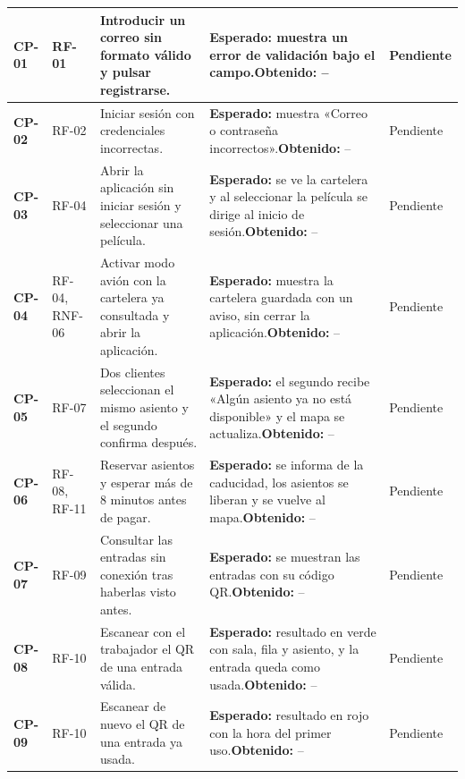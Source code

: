 \documentclass[11pt,a4paper]{article}
\begin{document}
\begin{longtable}{L{1.3cm} L{1.9cm} L{3.9cm} L{4.6cm} L{1.9cm}}
\textbf{CP-01} & RF-01 & Introducir un correo sin formato válido y pulsar registrarse. & \textbf{Esperado:} muestra un error de validación bajo el campo.\newline \textbf{Obtenido:} -- & Pendiente \\
\midrule
\textbf{CP-02} & RF-02 & Iniciar sesión con credenciales incorrectas. & \textbf{Esperado:} muestra «Correo o contraseña incorrectos».\newline \textbf{Obtenido:} -- & Pendiente \\
\midrule
\textbf{CP-03} & RF-04 & Abrir la aplicación sin iniciar sesión y seleccionar una película. & \textbf{Esperado:} se ve la cartelera y al seleccionar la película se dirige al inicio de sesión.\newline \textbf{Obtenido:} -- & Pendiente \\
\midrule
\textbf{CP-04} & RF-04, RNF-06 & Activar modo avión con la cartelera ya consultada y abrir la aplicación. & \textbf{Esperado:} muestra la cartelera guardada con un aviso, sin cerrar la aplicación.\newline \textbf{Obtenido:} -- & Pendiente \\
\midrule
\textbf{CP-05} & RF-07 & Dos clientes seleccionan el mismo asiento y el segundo confirma después. & \textbf{Esperado:} el segundo recibe «Algún asiento ya no está disponible» y el mapa se actualiza.\newline \textbf{Obtenido:} -- & Pendiente \\
\midrule
\textbf{CP-06} & RF-08, RF-11 & Reservar asientos y esperar más de 8 minutos antes de pagar. & \textbf{Esperado:} se informa de la caducidad, los asientos se liberan y se vuelve al mapa.\newline \textbf{Obtenido:} -- & Pendiente \\
\midrule
\textbf{CP-07} & RF-09 & Consultar las entradas sin conexión tras haberlas visto antes. & \textbf{Esperado:} se muestran las entradas con su código QR.\newline \textbf{Obtenido:} -- & Pendiente \\
\midrule
\textbf{CP-08} & RF-10 & Escanear con el trabajador el QR de una entrada válida. & \textbf{Esperado:} resultado en verde con sala, fila y asiento, y la entrada queda como usada.\newline \textbf{Obtenido:} -- & Pendiente \\
\midrule
\textbf{CP-09} & RF-10 & Escanear de nuevo el QR de una entrada ya usada. & \textbf{Esperado:} resultado en rojo con la hora del primer uso.\newline \textbf{Obtenido:} -- & Pendiente \\

\end{longtable}
\end{document}
